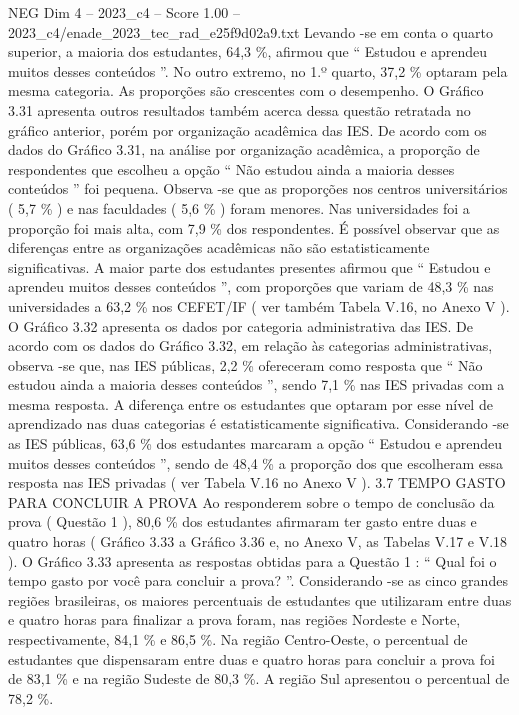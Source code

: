 \begin{textsample}{NEG Dim 4 – 2023\_c4 – Score 1.00 – 2023\_c4/enade\_2023\_tec\_rad\_e25f9d02a9.txt}
Levando -se em conta o quarto superior, a maioria dos estudantes, 64,3 \%, afirmou que “ Estudou e aprendeu muitos desses conteúdos ”.
No outro extremo, no 1.º quarto, 37,2 \% optaram pela mesma categoria.
As proporções são crescentes com o desempenho.
O Gráfico 3.31 apresenta outros resultados também acerca dessa questão retratada no gráfico anterior, porém por organização acadêmica das IES.
De acordo com os dados do Gráfico 3.31, na análise por organização acadêmica, a proporção de respondentes que escolheu a opção “ Não estudou ainda a maioria desses conteúdos ” foi pequena.
Observa -se que as proporções nos centros universitários ( 5,7 \% ) e nas faculdades ( 5,6 \% ) foram menores.
Nas universidades foi a proporção foi mais alta, com 7,9 \% dos respondentes.
É possível observar que as diferenças entre as organizações acadêmicas não são estatisticamente significativas.
A maior parte dos estudantes presentes afirmou que “ Estudou e aprendeu muitos desses conteúdos ”, com proporções que variam de 48,3 \% nas universidades a 63,2 \% nos CEFET/IF ( ver também Tabela V.16, no Anexo V ).
O Gráfico 3.32 apresenta os dados por categoria administrativa das IES.
De acordo com os dados do Gráfico 3.32, em relação às categorias administrativas, observa -se que, nas IES públicas, 2,2 \% ofereceram como resposta que “ Não estudou ainda a maioria desses conteúdos ”, sendo 7,1 \% nas IES privadas com a mesma resposta.
A diferença entre os estudantes que optaram por esse nível de aprendizado nas duas categorias é estatisticamente significativa.
Considerando -se as IES públicas, 63,6 \% dos estudantes marcaram a opção “ Estudou e aprendeu muitos desses conteúdos ”, sendo de 48,4 \% a proporção dos que escolheram essa resposta nas IES privadas ( ver Tabela V.16 no Anexo V ). 3.7 TEMPO GASTO PARA CONCLUIR A PROVA Ao responderem sobre o tempo de conclusão da prova ( Questão 1 ), 80,6 \% dos estudantes afirmaram ter gasto entre duas e quatro horas ( Gráfico 3.33 a Gráfico 3.36 e, no Anexo V, as Tabelas V.17 e V.18 ).
O Gráfico 3.33 apresenta as respostas obtidas para a Questão 1 : “ Qual foi o tempo gasto por você para concluir a prova? ”.
Considerando -se as cinco grandes regiões brasileiras, os maiores percentuais de estudantes que utilizaram entre duas e quatro horas para finalizar a prova foram, nas regiões Nordeste e Norte, respectivamente, 84,1 \% e 86,5 \%.
Na região Centro-Oeste, o percentual de estudantes que dispensaram entre duas e quatro horas para concluir a prova foi de 83,1 \% e na região Sudeste de 80,3 \%.
A região Sul apresentou o percentual de 78,2 \%.

\end{textsample}
